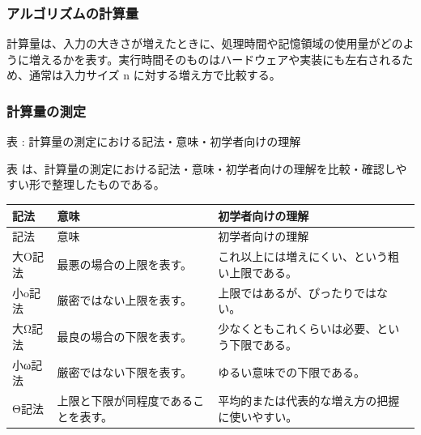\subsubsection{アルゴリズムの計算量}

計算量は、入力の大きさが増えたときに、処理時間や記憶領域の使用量がどのように増えるかを表す。実行時間そのものはハードウェアや実装にも左右されるため、通常は入力サイズ n に対する増え方で比較する。

\subsubsection{計算量の測定}

\par\smallskip\noindent{}\label{tab:ch16-09}表 \thetable: 計算量の測定における記法・意味・初学者向けの理解\par\smallskip
表 \thetable は、計算量の測定における記法・意味・初学者向けの理解を比較・確認しやすい形で整理したものである。\par\smallskip
\begin{longtable}{>{\raggedright\arraybackslash}p{}>{\raggedright\arraybackslash}p{}>{\raggedright\arraybackslash}p{}}
\toprule
記法 & 意味 & 初学者向けの理解 \\
\midrule
\endfirsthead
\toprule
記法 & 意味 & 初学者向けの理解 \\
\midrule
\endhead
大O記法 & 最悪の場合の上限を表す。 & これ以上には増えにくい、という粗い上限である。 \\
小o記法 & 厳密ではない上限を表す。 & 上限ではあるが、ぴったりではない。 \\
大Ω記法 & 最良の場合の下限を表す。 & 少なくともこれくらいは必要、という下限である。 \\
小ω記法 & 厳密ではない下限を表す。 & ゆるい意味での下限である。 \\
Θ記法 & 上限と下限が同程度であることを表す。 & 平均的または代表的な増え方の把握に使いやすい。 \\
\bottomrule
\end{longtable}

